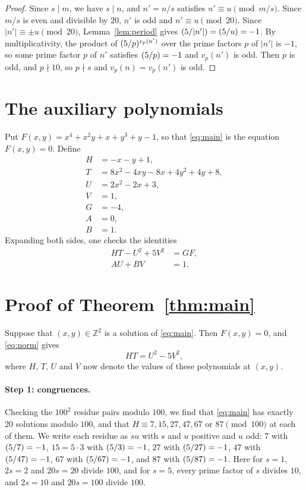 \documentclass[11pt]{article}
\newcommand{\Z}{\mathbb{Z}}
\newcommand{\leg}[2]{\mathchoice{\biggl(\dfrac{#1}{#2}\biggr)}{(#1/#2)}{(#1/#2)}{(#1/#2)}}
\begin{document}
\begin{proof}
Since $s\mid m$, we have $s\mid n$, and $n'=n/s$ satisfies $n'\equiv u\pmod{m/s}$. Since $m/s$ is even and divisible by $20$, $n'$ is odd and $n'\equiv u\pmod{20}$. Since $|n'|\equiv\pm u\pmod{20}$, Lemma~\ref{lem:period} gives $\leg{5}{|n'|}=\leg{5}{u}=-1$. By multiplicativity, the product of $\leg{5}{p}^{v_p(n')}$ over the prime factors $p$ of $|n'|$ is $-1$, so some prime factor $p$ of $n'$ satisfies $\leg{5}{p}=-1$ and $v_p(n')$ is odd. Then $p$ is odd, and $p\nmid10$, so $p\nmid s$ and $v_p(n)=v_p(n')$ is odd.
\end{proof}

\section{The auxiliary polynomials}

Put $F(x,y)=x^{4}+x^{2}y+x+y^{3}+y-1$, so that \eqref{eq:main} is the equation $F(x,y)=0$. Define
\begin{align*}
H&=-x-y+1,\\
T&=8x^{2}-4xy-8x+4y^{2}+4y+8,\\
U&=2x^{2}-2x+3,\\
V&=1,\\
G&=-4,\\
A&=0,\\
B&=1.
\end{align*}
Expanding both sides, one checks the identities
\begin{align}
HT-U^2+5V^2&=GF,\label{eq:norm}\\
AU+BV&=1.\label{eq:bezout}
\end{align}

\section{Proof of Theorem~\ref{thm:main}}

Suppose that $(x,y)\in\Z^2$ is a solution of \eqref{eq:main}. Then $F(x,y)=0$, and \eqref{eq:norm} gives
\begin{equation}\label{eq:HT}
HT=U^2-5V^2,
\end{equation}
where $H$, $T$, $U$ and $V$ now denote the values of these polynomials at $(x,y)$.

\paragraph{Step 1: congruences.} Checking the $100^2$ residue pairs modulo $100$, we find that \eqref{eq:main} has exactly 20 solutions modulo $100$, and that $H\equiv7,\allowbreak 15,\allowbreak 27,\allowbreak 47,\allowbreak 67\text{ or }87\pmod{100}$ at each of them. We write each residue as $su$ with $s$ and $u$ positive and $u$ odd: $7$ with $\leg{5}{7}=-1$, $15=5\cdot3$ with $\leg{5}{3}=-1$, $27$ with $\leg{5}{27}=-1$, $47$ with $\leg{5}{47}=-1$, $67$ with $\leg{5}{67}=-1$, and $87$ with $\leg{5}{87}=-1$. Here for $s=1$, $2s=2$ and $20s=20$ divide $100$, and for $s=5$, every prime factor of $s$ divides $10$, and $2s=10$ and $20s=100$ divide $100$.
\end{document}

